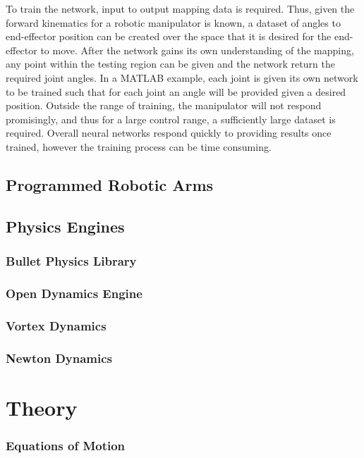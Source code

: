 \documentclass[12pt,openany,a4paper]{book}
\begin{document}
To train the network, input to output mapping data is required. Thus, given the forward kinematics for a robotic manipulator is known, a dataset of angles to end-effector position can be created over the space that it is desired for the end-effector to move. After the network gains its own understanding of the mapping, any point within the testing region can be given and the network return the required joint angles. In a MATLAB example, each joint is given its own network to be trained such that for each joint an angle will be provided given a desired position. Outside the range of training, the manipulator will not respond promisingly, and thus for a large control range, a sufficiently large dataset is required. Overall neural networks respond quickly to providing results once trained, however the training process can be time consuming.

\section{Programmed Robotic Arms}


\section{Physics Engines}
\subsection{Bullet Physics Library}

\subsection{Open Dynamics Engine}

\subsection{Vortex Dynamics}

\subsection{Newton Dynamics}



\chapter{Theory}





\subsection{Equations of Motion}
\end{document}
